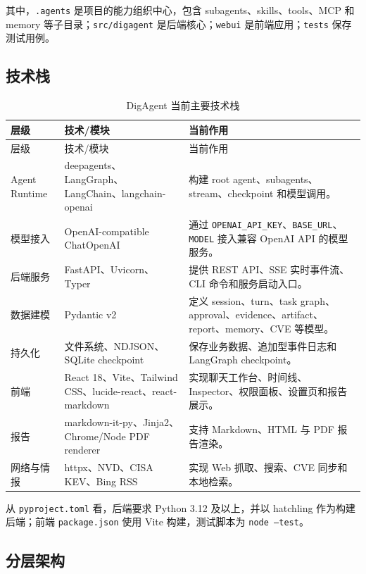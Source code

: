 \documentclass[UTF8,zihao=-4,a4paper,fontset=none]{ctexart}
\newcommand{\code}[1]{\texttt{\footnotesize #1}}
\begin{document}
其中，\code{.agents} 是项目的能力组织中心，包含 subagents、skills、tools、MCP 和 memory 等子目录；\code{src/digagent} 是后端核心；\code{webui} 是前端应用；\code{tests} 保存测试用例。

\subsection{技术栈}

\begin{longtable}{p{}p{}p{}}
\caption{DigAgent 当前主要技术栈}\label{tab:techstack}\\
\toprule
层级 & 技术/模块 & 当前作用 \\
\midrule
\endfirsthead
\toprule
层级 & 技术/模块 & 当前作用 \\
\midrule
\endhead
Agent Runtime & deepagents、LangGraph、LangChain、langchain-openai & 构建 root agent、subagents、stream、checkpoint 和模型调用。 \\
模型接入 & OpenAI-compatible ChatOpenAI & 通过 \code{OPENAI\_API\_KEY}、\code{BASE\_URL}、\code{MODEL} 接入兼容 OpenAI API 的模型服务。 \\
后端服务 & FastAPI、Uvicorn、Typer & 提供 REST API、SSE 实时事件流、CLI 命令和服务启动入口。 \\
数据建模 & Pydantic v2 & 定义 session、turn、task graph、approval、evidence、artifact、report、memory、CVE 等模型。 \\
持久化 & 文件系统、NDJSON、SQLite checkpoint & 保存业务数据、追加型事件日志和 LangGraph checkpoint。 \\
前端 & React 18、Vite、Tailwind CSS、lucide-react、react-markdown & 实现聊天工作台、时间线、Inspector、权限面板、设置页和报告展示。 \\
报告 & markdown-it-py、Jinja2、Chrome/Node PDF renderer & 支持 Markdown、HTML 与 PDF 报告渲染。 \\
网络与情报 & httpx、NVD、CISA KEV、Bing RSS & 实现 Web 抓取、搜索、CVE 同步和本地检索。 \\
\bottomrule
\end{longtable}

从 \code{pyproject.toml} 看，后端要求 Python 3.12 及以上，并以 hatchling 作为构建后端；前端 \code{package.json} 使用 Vite 构建，测试脚本为 \code{node --test}。

\subsection{分层架构}
\end{document}
